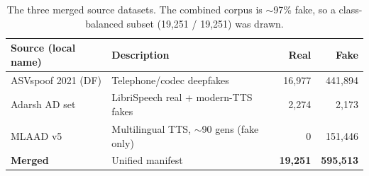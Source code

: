 
\begin{table}[t]
\centering
\caption{The three merged source datasets. The combined corpus is
$\sim$97\% fake, so a class-balanced subset (19{,}251 / 19{,}251) was drawn.}
\label{tab:datasets}
\begin{tabular}{@{}llrr@{}}
\toprule
Source (local name) & Description & Real & Fake \\
\midrule
ASVspoof 2021 (DF) & Telephone/codec deepfakes            & 16{,}977 & 441{,}894 \\
Adarsh AD set      & LibriSpeech real + modern-TTS fakes  & 2{,}274  & 2{,}173   \\
MLAAD v5           & Multilingual TTS, $\sim$90 gens (fake only) & 0 & 151{,}446 \\
\midrule
\textbf{Merged}    & Unified manifest                     & \textbf{19{,}251} & \textbf{595{,}513} \\
\bottomrule
\end{tabular}
\end{table}


